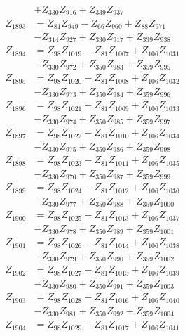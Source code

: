 \begin{multicols}{2}
\begin{align}
&+ Z_{330}Z_{916} + Z_{339}Z_{937} \nonumber \\
Z_{1893} &= Z_{81}Z_{949} - Z_{66}Z_{960} + Z_{88}Z_{971}  \nonumber \\
&- Z_{314}Z_{927} + Z_{330}Z_{917} + Z_{339}Z_{938} \nonumber \\
Z_{1894} &= Z_{98}Z_{1019} - Z_{81}Z_{1007} + Z_{106}Z_{1031}  \nonumber \\
&- Z_{330}Z_{972} + Z_{350}Z_{983} + Z_{359}Z_{995} \nonumber \\
Z_{1895} &= Z_{98}Z_{1020} - Z_{81}Z_{1008} + Z_{106}Z_{1032}  \nonumber \\
&- Z_{330}Z_{973} + Z_{350}Z_{984} + Z_{359}Z_{996} \nonumber \\
Z_{1896} &= Z_{98}Z_{1021} - Z_{81}Z_{1009} + Z_{106}Z_{1033}  \nonumber \\
&- Z_{330}Z_{974} + Z_{350}Z_{985} + Z_{359}Z_{997} \nonumber \\
Z_{1897} &= Z_{98}Z_{1022} - Z_{81}Z_{1010} + Z_{106}Z_{1034}  \nonumber \\
&- Z_{330}Z_{975} + Z_{350}Z_{986} + Z_{359}Z_{998} \nonumber \\
Z_{1898} &= Z_{98}Z_{1023} - Z_{81}Z_{1011} + Z_{106}Z_{1035}  \nonumber \\
&- Z_{330}Z_{976} + Z_{350}Z_{987} + Z_{359}Z_{999} \nonumber \\
Z_{1899} &= Z_{98}Z_{1024} - Z_{81}Z_{1012} + Z_{106}Z_{1036}  \nonumber \\
&- Z_{330}Z_{977} + Z_{350}Z_{988} + Z_{359}Z_{1000} \nonumber \\
Z_{1900} &= Z_{98}Z_{1025} - Z_{81}Z_{1013} + Z_{106}Z_{1037}  \nonumber \\
&- Z_{330}Z_{978} + Z_{350}Z_{989} + Z_{359}Z_{1001} \nonumber \\
Z_{1901} &= Z_{98}Z_{1026} - Z_{81}Z_{1014} + Z_{106}Z_{1038}  \nonumber \\
&- Z_{330}Z_{979} + Z_{350}Z_{990} + Z_{359}Z_{1002} \nonumber \\
Z_{1902} &= Z_{98}Z_{1027} - Z_{81}Z_{1015} + Z_{106}Z_{1039}  \nonumber \\
&- Z_{330}Z_{980} + Z_{350}Z_{991} + Z_{359}Z_{1003} \nonumber \\
Z_{1903} &= Z_{98}Z_{1028} - Z_{81}Z_{1016} + Z_{106}Z_{1040}  \nonumber \\
&- Z_{330}Z_{981} + Z_{350}Z_{992} + Z_{359}Z_{1004} \nonumber \\
Z_{1904} &= Z_{98}Z_{1029} - Z_{81}Z_{1017} + Z_{106}Z_{1041}  \nonumber \\

\end{align}
\end{multicols}
